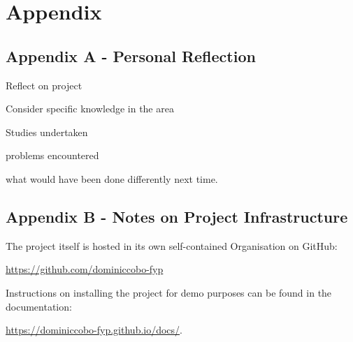 \chapter{Appendix}

\section{Appendix A - Personal Reflection}

Reflect on project

Consider specific knowledge in the area

Studies undertaken

problems encountered

what would have been done differently next time.

\section{Appendix B - Notes on Project Infrastructure}
\label{projectAssets}

The project itself is hosted in its own self-contained Organisation on GitHub:

\url{https://github.com/dominiccobo-fyp}

Instructions on installing the project for demo purposes can be found in the documentation:

\url{https://dominiccobo-fyp.github.io/docs/}.